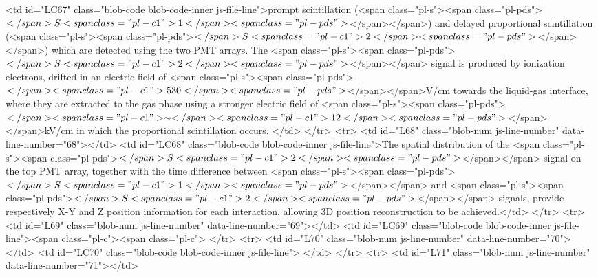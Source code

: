         <td id="LC67" class="blob-code blob-code-inner js-file-line">prompt scintillation (<span class="pl-s"><span class="pl-pds">$</span>S<span class="pl-c1">1</span><span class="pl-pds">$</span></span>) and delayed proportional scintillation (<span class="pl-s"><span class="pl-pds">$</span>S<span class="pl-c1">2</span><span class="pl-pds">$</span></span>) which are detected using the two PMT arrays. The <span class="pl-s"><span class="pl-pds">$</span>S<span class="pl-c1">2</span><span class="pl-pds">$</span></span> signal is produced by ionization electrons, drifted in an electric field of <span class="pl-s"><span class="pl-pds">$</span><span class="pl-c1">530</span><span class="pl-pds">$</span></span>V/cm towards the liquid-gas interface, where they are extracted to the gas phase using a stronger electric field of <span class="pl-s"><span class="pl-pds">$</span><span class="pl-c1">\sim</span><span class="pl-c1">12</span><span class="pl-pds">$</span></span>kV/cm in which the proportional scintillation occurs. </td>
      </tr>
      <tr>
        <td id="L68" class="blob-num js-line-number" data-line-number="68"></td>
        <td id="LC68" class="blob-code blob-code-inner js-file-line">The spatial distribution of the <span class="pl-s"><span class="pl-pds">$</span>S<span class="pl-c1">2</span><span class="pl-pds">$</span></span> signal on the top PMT array, together with the time difference between <span class="pl-s"><span class="pl-pds">$</span>S<span class="pl-c1">1</span><span class="pl-pds">$</span></span> and <span class="pl-s"><span class="pl-pds">$</span>S<span class="pl-c1">2</span><span class="pl-pds">$</span></span> signals, provide respectively X-Y and Z position information for each interaction, allowing 3D position reconstruction to be achieved.</td>
      </tr>
      <tr>
        <td id="L69" class="blob-num js-line-number" data-line-number="69"></td>
        <td id="LC69" class="blob-code blob-code-inner js-file-line"><span class="pl-c"><span class="pl-c">%
      </tr>
      <tr>
        <td id="L70" class="blob-num js-line-number" data-line-number="70"></td>
        <td id="LC70" class="blob-code blob-code-inner js-file-line">
</td>
      </tr>
      <tr>
        <td id="L71" class="blob-num js-line-number" data-line-number="71"></td>
